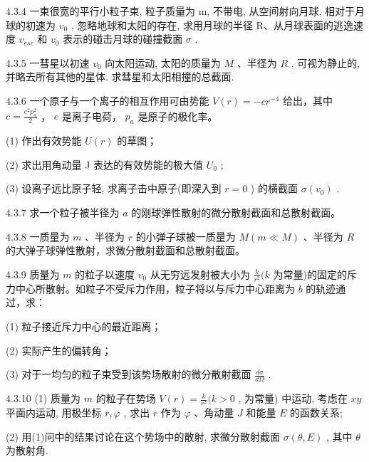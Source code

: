 \begin{problem}{4.3.4}
一束很宽的平行小粒子束, 粒子质量为 m, 不带电, 从空间射向月球, 相对于月球的初速为 $v_{0}$ , 忽略地球和太阳的存在, 求用月球的半径 R、从月球表面的逃逸速度 $v_{esc}$ 和 $v_{0}$ 表示的碰击月球的碰撞截面 $\sigma$ .
\end{problem}
\clearpage


\begin{problem}{4.3.5}
一彗星以初速 $v_{0}$ 向太阳运动, 太阳的质量为 $M$ 、半径为 $R$ , 可视为静止的, 并略去所有其他的星体. 求彗星和太阳相撞的总截面.
\end{problem}
\clearpage


\begin{problem}{4.3.6}
一个原子与一个离子的相互作用可由势能 $V(r) = -cr^{-4}$ 给出，其中 $c = \frac{e^2p_a^2}{2}$ ， $e$ 是离子电荷， $p_a$ 是原子的极化率。

(1) 作出有效势能 $U(r)$ 的草图；

(2) 求出用角动量 J 表达的有效势能的极大值 $U_{0}$ ;

(3) 设离子远比原子轻, 求离子击中原子(即深入到 $r = 0$ ) 的横截面 $\sigma(v_0)$ .
\end{problem}
\clearpage


\begin{problem}{4.3.7}
求一个粒子被半径为 $a$ 的刚球弹性散射的微分散射截面和总散射截面。
\end{problem}
\clearpage


\begin{problem}{4.3.8}
一质量为 $m$ 、半径为 $r$ 的小弹子球被一质量为 $M(m \ll M)$ 、半径为 $R$ 的大弹子球弹性散射，求微分散射截面和总散射截面。
\end{problem}
\clearpage


\begin{problem}{4.3.9}
质量为 $m$ 的粒子以速度 $v_{0}$ 从无穷远发射被大小为 $\frac{k}{r^2} (k$ 为常量)的固定的斥力中心所散射。如粒子不受斥力作用，粒子将以与斥力中心距离为 $b$ 的轨迹通过，求：

(1) 粒子接近斥力中心的最近距离；

(2) 实际产生的偏转角；

(3) 对于一均匀的粒子束受到该势场散射的微分散射截面 $\frac{d\sigma}{d\Omega}$ .
\end{problem}
\clearpage


\begin{problem}{4.3.10}
(1) 质量为 $m$ 的粒子在势场 $V(r) = \frac{k}{r^2} (k > 0$ , 为常量) 中运动, 考虑在 $xy$ 平面内运动, 用极坐标 $r, \varphi$ , 求出 $r$ 作为 $\varphi$ 、角动量 $J$ 和能量 $E$ 的函数关系;

(2) 用(1)问中的结果讨论在这个势场中的散射, 求微分散射截面 $\sigma(\theta, E)$ , 其中 $\theta$ 为散射角.
\end{problem}
\clearpage


